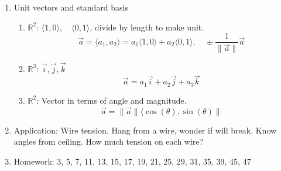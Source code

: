 \documentclass{article}
\begin{document}
\begin{enumerate}
\item Unit vectors and standard basis
\begin{enumerate}
\item $\mathbb{R}^2$: $\langle 1,0 \rangle, \quad \langle 0,1 \rangle$, divide by length to make unit.
\[
\vec{a} = \langle a_1, a_2 \rangle = a_1 \langle 1,0 \rangle + a_2 \langle 0,1 \rangle, \quad \pm \frac{1}{\| \vec{a} \|} \vec{a}
\]
\item $\mathbb{R}^3$: $\vec{i}, \vec{j}, \vec{k}$
\[
\vec{a} = a_1 \vec{i} + a_2 \vec{j} + a_3 \vec{k}
\]
\item $\mathbb{R}^2$: Vector in terms of angle and magnitude.
\[
\vec{a} = \|\vec{a}\| \langle \cos(\theta), \sin(\theta) \|
\]
\end{enumerate}

\item Application: Wire tension. Hang from a wire, wonder if will break. Know angles from ceiling. How much tension on each wire?

\item Homework: 3, 5, 7, 11, 13, 15, 17, 19, 21, 25, 29, 31, 35, 39, 45, 47

\end{enumerate}
\end{document}
